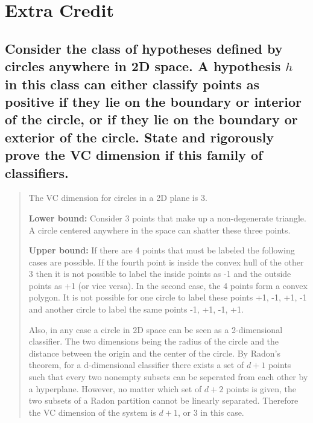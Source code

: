 \documentclass[11pt]{article}
\begin{document}
\section{Extra Credit}

\subsection{Consider the class of hypotheses defined by circles anywhere in 2D space. A hypothesis $h$ in this class can either classify points as positive if they lie on the boundary or interior of the circle, or if they lie on the boundary or exterior of the circle. State and rigorously prove the VC dimension if this family of classifiers.}
\begin{quote}
	
	\vspace{3 mm}

	The VC dimension for circles in a 2D plane is 3.

	\vspace{1 mm}
	
	\textbf{Lower bound:} Consider 3 points that make up a non-degenerate triangle. A circle centered anywhere in the space can shatter these three points.

	\vspace{1 mm}

	\textbf{Upper bound:} If there are 4 points that must be labeled the following cases are possible. If the fourth point is inside the convex hull of the other 3 then it is not possible to label the inside points as -1 and the outside points as +1 (or vice versa). In the second case, the 4 points form a convex polygon. It is not possible for one circle to label these points +1, -1, +1, -1 and another circle to label the same points -1, +1, -1, +1. 
	
	\vspace{1 mm}
	
	Also, in any case a circle in 2D space can be seen as a 2-dimensional classifier. The two dimensions being the radius of the circle and the distance between the origin and the center of the circle. By Radon's theorem, for a d-dimensional classifier there exists a set of $d+1$ points such that every two nonempty subsets can be seperated from each other by a hyperplane. However, no matter which set of $d+2$ points is given, the two subsets of a Radon partition cannot be linearly separated. Therefore the VC dimension of the system is $d+1$, or 3 in this case.
\end{quote}
\end{document}

